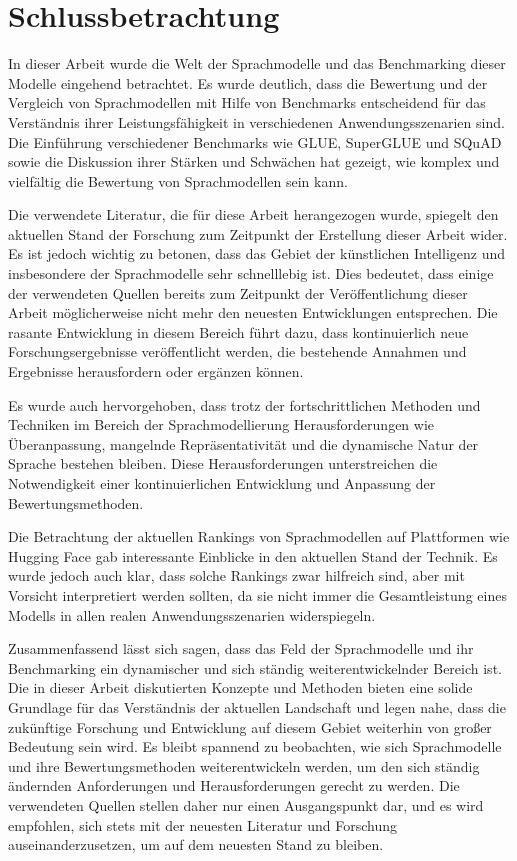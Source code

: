 \section{Schlussbetrachtung} \label{sec:schlussbetrachtung}
In dieser Arbeit wurde die Welt der Sprachmodelle und das Benchmarking dieser Modelle eingehend betrachtet.
Es wurde deutlich, dass die Bewertung und der Vergleich von Sprachmodellen mit Hilfe von Benchmarks entscheidend für das Verständnis ihrer Leistungsfähigkeit in verschiedenen Anwendungsszenarien sind.
Die Einführung verschiedener Benchmarks wie GLUE, SuperGLUE und SQuAD sowie die Diskussion ihrer Stärken und Schwächen hat gezeigt, wie komplex und vielfältig die Bewertung von Sprachmodellen sein kann.

Die verwendete Literatur, die für diese Arbeit herangezogen wurde, spiegelt den aktuellen Stand der Forschung zum Zeitpunkt der Erstellung dieser Arbeit wider.
Es ist jedoch wichtig zu betonen, dass das Gebiet der künstlichen Intelligenz und insbesondere der Sprachmodelle sehr schnelllebig ist.
Dies bedeutet, dass einige der verwendeten Quellen bereits zum Zeitpunkt der Veröffentlichung dieser Arbeit möglicherweise nicht mehr den neuesten Entwicklungen entsprechen.
Die rasante Entwicklung in diesem Bereich führt dazu, dass kontinuierlich neue Forschungsergebnisse veröffentlicht werden, die bestehende Annahmen und Ergebnisse herausfordern oder ergänzen können.

Es wurde auch hervorgehoben, dass trotz der fortschrittlichen Methoden und Techniken im Bereich der Sprachmodellierung Herausforderungen wie Überanpassung, mangelnde Repräsentativität und die dynamische Natur der Sprache bestehen bleiben.
Diese Herausforderungen unterstreichen die Notwendigkeit einer kontinuierlichen Entwicklung und Anpassung der Bewertungsmethoden.

Die Betrachtung der aktuellen Rankings von Sprachmodellen auf Plattformen wie Hugging Face gab interessante Einblicke in den aktuellen Stand der Technik. Es wurde jedoch auch klar, dass solche Rankings zwar hilfreich sind, aber mit Vorsicht interpretiert werden sollten, da sie nicht immer die Gesamtleistung eines Modells in allen realen Anwendungsszenarien widerspiegeln.

Zusammenfassend lässt sich sagen, dass das Feld der Sprachmodelle und ihr Benchmarking ein dynamischer und sich ständig weiterentwickelnder Bereich ist.
Die in dieser Arbeit diskutierten Konzepte und Methoden bieten eine solide Grundlage für das Verständnis der aktuellen Landschaft und legen nahe, dass die zukünftige Forschung und Entwicklung auf diesem Gebiet weiterhin von großer Bedeutung sein wird.
Es bleibt spannend zu beobachten, wie sich Sprachmodelle und ihre Bewertungsmethoden weiterentwickeln werden, um den sich ständig ändernden Anforderungen und Herausforderungen gerecht zu werden.
Die verwendeten Quellen stellen daher nur einen Ausgangspunkt dar, und es wird empfohlen, sich stets mit der neuesten Literatur und Forschung auseinanderzusetzen, um auf dem neuesten Stand zu bleiben.